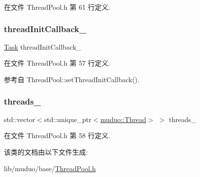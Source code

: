 在文件 Thread\+Pool.\+h 第 61 行定义.

\mbox{\label{classmuduo_1_1ThreadPool_ad985abd32dc4aa2c30852570d3a57136}} 
\subsubsection{\texorpdfstring{thread\+Init\+Callback\+\_\+}{threadInitCallback\_}}
{\footnotesize\ttfamily \hyperlink{classmuduo_1_1ThreadPool_a46c264006febdf6c5dae5921d59c18d2}{Task} thread\+Init\+Callback\+\_\+\hspace{0.3cm}{\ttfamily [private]}}



在文件 Thread\+Pool.\+h 第 57 行定义.



参考自 Thread\+Pool\+::set\+Thread\+Init\+Callback().

\mbox{\label{classmuduo_1_1ThreadPool_ae497beb888525fad65f6fd9e8f2bc429}} 
\subsubsection{\texorpdfstring{threads\+\_\+}{threads\_}}
{\footnotesize\ttfamily std\+::vector$<$std\+::unique\+\_\+ptr$<$\hyperlink{classmuduo_1_1Thread}{muduo\+::\+Thread}$>$ $>$ threads\+\_\+\hspace{0.3cm}{\ttfamily [private]}}



在文件 Thread\+Pool.\+h 第 58 行定义.



该类的文档由以下文件生成\+:\begin{DoxyCompactItemize}
\item 
lib/muduo/base/\hyperlink{ThreadPool_8h}{Thread\+Pool.\+h}\end{DoxyCompactItemize}
